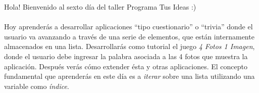 Hola! Bienvenido al sexto día del taller Programa Tus Ideas :)

\paragraph{}
Hoy aprenderás a desarrollar aplicaciones ``tipo cuestionario'' o
``trivia'' donde el usuario va avanzando a través de una serie de
elementos, que están internamente almacenados en una
lista. Desarrollarás como tutorial el juego \emph{4 Fotos 1 Imagen},
donde el usuario debe ingresar la palabra asociada a las 4 fotos que
muestra la aplicación. Después verás cómo extender ésta y otras
aplicaciones. El concepto fundamental que aprenderás en este día es a
\emph{iterar} sobre una lista utilizando una variable como
\emph{índice}.